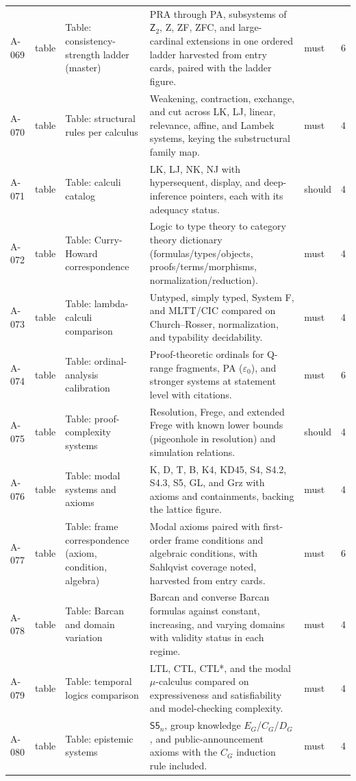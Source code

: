 \begin{longtable}{@{}p{0.45in}p{0.78in}p{2.02in}p{2.6in}p{0.42in}p{0.16in}@{}}
A-069 & table & Table: consistency-strength ladder (master) & PRA through PA, subsystems of \(\mathsf Z_2\), Z, ZF, ZFC, and large-cardinal extensions in one ordered ladder harvested from entry cards, paired with the ladder figure. & must & 6 \\
A-070 & table & Table: structural rules per calculus & Weakening, contraction, exchange, and cut across LK, LJ, linear, relevance, affine, and Lambek systems, keying the substructural family map. & must & 4 \\
A-071 & table & Table: calculi catalog & LK, LJ, NK, NJ with hypersequent, display, and deep-inference pointers, each with its adequacy status. & should & 4 \\
A-072 & table & Table: Curry-Howard correspondence & Logic to type theory to category theory dictionary (formulas/types/objects, proofs/terms/morphisms, normalization/reduction). & must & 4 \\
A-073 & table & Table: lambda-calculi comparison & Untyped, simply typed, System F, and MLTT/CIC compared on Church--Rosser, normalization, and typability decidability. & must & 4 \\
A-074 & table & Table: ordinal-analysis calibration & Proof-theoretic ordinals for Q-range fragments, PA (\(\varepsilon_0\)), and stronger systems at statement level with citations. & must & 6 \\
A-075 & table & Table: proof-complexity systems & Resolution, Frege, and extended Frege with known lower bounds (pigeonhole in resolution) and simulation relations. & should & 4 \\
A-076 & table & Table: modal systems and axioms & K, D, T, B, K4, KD45, S4, S4.2, S4.3, S5, GL, and Grz with axioms and containments, backing the lattice figure. & must & 4 \\
A-077 & table & Table: frame correspondence (axiom, condition, algebra) & Modal axioms paired with first-order frame conditions and algebraic conditions, with Sahlqvist coverage noted, harvested from entry cards. & must & 6 \\
A-078 & table & Table: Barcan and domain variation & Barcan and converse Barcan formulas against constant, increasing, and varying domains with validity status in each regime. & must & 4 \\
A-079 & table & Table: temporal logics comparison & LTL, CTL, CTL*, and the modal \(\mu\)-calculus compared on expressiveness and satisfiability and model-checking complexity. & must & 4 \\
A-080 & table & Table: epistemic systems & \(\mathsf{S5}_n\), group knowledge \(E_G\)/\(C_G\)/\(D_G\), and public-announcement axioms with the \(C_G\) induction rule included. & must & 4 \\

\end{longtable}
